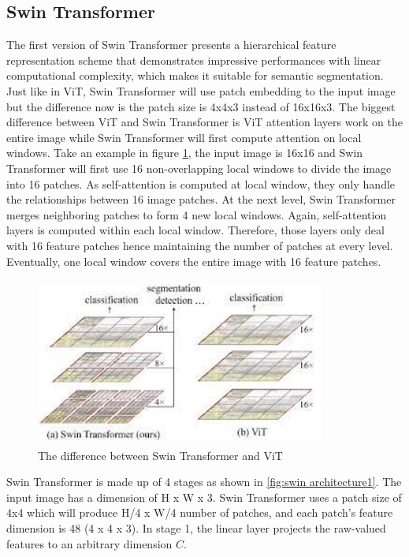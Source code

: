 \subsection{Swin Transformer}
The first version of Swin Transformer \cite{swin-v1} presents a hierarchical feature representation scheme that demonstrates impressive performances with linear computational complexity, which makes it suitable for semantic segmentation. Just like in ViT, Swin Transformer will use patch embedding to the input image but the difference now is the patch size is 4x4x3 instead of 16x16x3. The biggest difference between ViT and Swin Transformer is ViT attention layers work on the entire image while Swin Transformer will first compute attention on local windows. Take an example in figure \ref{fig:swin-vs-vit}, the input image is 16x16 and Swin Transformer will first use 16 non-overlapping local windows to divide the image into 16 patches. As self-attention is computed at local window, they only handle the relationships between 16 image patches. At the next level, Swin Transformer merges neighboring patches to form 4 new local windows. Again, self-attention layers is computed within each local window. Therefore, those layers only deal with 16 feature patches hence maintaining the number of patches at every level. Eventually, one local window covers the entire image with 16 feature patches.
\FloatBarrier
\begin{figure}[ht]
\includegraphics[width=9.5cm, height=5.5cm]{images/swin vs vit.png}
\centering
\caption{The difference between Swin Transformer and ViT \protect\cite{swin-v1}}
\label{fig:swin-vs-vit}
\end{figure}

Swin Transformer is made up of 4 stages as shown in \ref{fig:swin architecture1}. The input image has a dimension of H x W x 3. Swin Transformer uses a patch size of 4x4 which will produce H/4 x W/4 number of patches, and each patch’s feature dimension is 48 (4 x 4 x 3). In stage 1, the linear layer projects the raw-valued features to an arbitrary dimension $C$.

